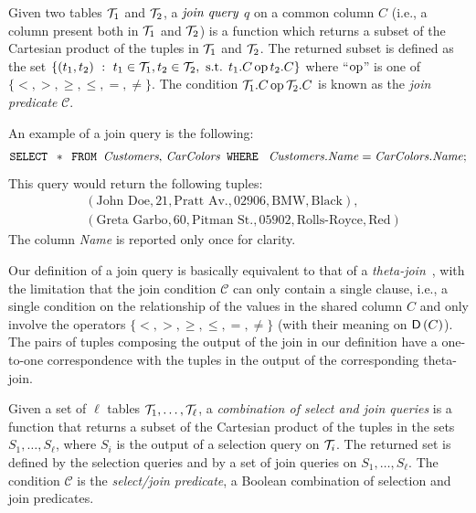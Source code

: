 \begin{definition}\label{def:joinquery}
  Given two tables ${\cal T}_1$ and ${\cal T}_2$, a $\emph{join query}$ $q$ on a common
  column $C$ (i.e., a column present both in ${\cal T}_1$ and ${\cal T}_2$) is a
  function which returns a subset of the Cartesian product of the tuples in
  ${\cal T}_1$ and ${\cal T}_2$. The returned subset is defined as the set $ \{(t_1,t_2)
  ~:~ t_1\in{\cal T}_1, t_2\in{\cal T}_2, \text{ s.t. } t_1.C \operatorname{op} t_2.C \}$ where
  ``$\operatorname{op}$'' is one of $\{<,>,\ge,\le,=,\neq\}$.
  The condition ${\cal T}_1.C \operatorname{op} {\cal T}_2.C$ is known as the \emph{join predicate}
  $\mathcal{C}$.
\end{definition}
An example of a join query is the following:
\[
\text{\texttt{SELECT }} * \text{\texttt{ FROM }} \text{\emph{Customers}, \emph{CarColors}} \text{\texttt{ WHERE }} \text{ 
\emph{Customers.Name}} = \text{\emph{CarColors.Name}};
\]
This query would return the following tuples:
\begin{align*}
  &(\text{John Doe}, 21, \text{Pratt Av.}, \text{02906}, \text{BMW}, \text{Black}), \\
  &(\text{Greta Garbo}, 60, \text{Pitman St.}, \text{05902}, \text{Rolls-Royce}, \text{Red})
\end{align*}
The column \emph{Name} is reported only once for clarity.

Our definition of a join query is basically equivalent to that of a
\emph{theta-join}~\citep[Sect.5.2.7]{GarciaMolinaUW02}, with the limitation that
the join condition $\mathcal{C}$ can only contain a single clause, i.e., a single
condition on the relationship of the values in the shared column $C$ and only
involve the operators $\{<,>,\ge,\le,=,\neq\}$ (with their meaning on
$\mathsf{D}\left(C\right)$). The pairs of tuples composing the output of the join in our
definition have a one-to-one correspondence with the tuples in the output of the
corresponding theta-join.

\begin{definition}\label{def:general query}
  Given a set of $\ell$ tables ${\cal T}_1,\dotsc,{\cal T}_\ell$, a \emph{combination of
  select and join queries} is a function that returns a subset of the Cartesian
  product of the tuples in the sets $S_1,\dotsc,S_\ell$, where $S_i$ is the
  output of a selection query on ${\cal T}_i$. The returned set is defined by the
  selection queries and by a set of join queries on $S_1,\dotsc,S_\ell$.
 The condition $\mathcal{C}$ is the \emph{select/join predicate}, a Boolean combination
  of selection and join predicates.
\end{definition}

